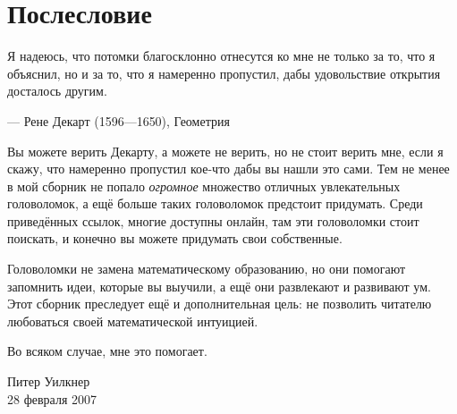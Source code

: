 \chapter{Послесловие}


\setlength{\epigraphwidth}{.83\textwidth}
\epigraph{Я надеюсь, что потомки благосклонно отнесутся ко мне не только за то, что я объяснил, но и за то, что я намеренно пропустил, дабы удовольствие открытия досталось другим.}{--- Рене Декарт (1596---1650), Геометрия}


Вы можете верить Декарту, а можете не верить, но не стоит верить мне, если я скажу, что намеренно пропустил кое-что дабы вы нашли это сами.
Тем не менее в мой сборник не попало \emph{огромное} множество отличных увлекательных головоломок, а ещё больше таких головоломок предстоит придумать.
Среди приведённых ссылок, многие доступны онлайн, там эти головоломки стоит поискать,
и конечно вы можете придумать свои собственные.

Головоломки не замена математическому образованию, но они помогают запомнить идеи, которые вы выучили, а ещё они развлекают и развивают ум.
Этот сборник преследует ещё и дополнительная цель:
не позволить читателю любоваться своей математической интуицией.

Во всяком случае, мне это помогает.

\begin{flushright}
Питер Уилкнер\\
28 февраля 2007
\end{flushright}
